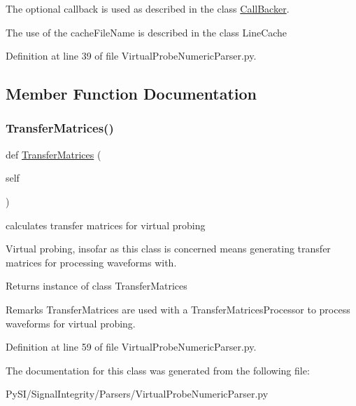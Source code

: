 The optional callback is used as described in the class \hyperlink{namespaceSignalIntegrity_1_1CallBacker}{Call\+Backer}.

The use of the cache\+File\+Name is described in the class Line\+Cache 

Definition at line 39 of file Virtual\+Probe\+Numeric\+Parser.\+py.



\subsection{Member Function Documentation}
\mbox{\label{classSignalIntegrity_1_1Parsers_1_1VirtualProbeNumericParser_1_1VirtualProbeNumericParser_a836e87421e9e21a6676da06625b644b1}} 
\subsubsection{\texorpdfstring{Transfer\+Matrices()}{TransferMatrices()}}
{\footnotesize\ttfamily def \hyperlink{classSignalIntegrity_1_1FrequencyDomain_1_1TransferMatrices_1_1TransferMatrices}{Transfer\+Matrices} (\begin{DoxyParamCaption}\item[{}]{self }\end{DoxyParamCaption})}



calculates transfer matrices for virtual probing 

Virtual probing, insofar as this class is concerned means generating transfer matrices for processing waveforms with.

\begin{DoxyReturn}{Returns}
instance of class Transfer\+Matrices
\end{DoxyReturn}
\begin{DoxyRemark}{Remarks}
Transfer\+Matrices are used with a Transfer\+Matrices\+Processor to process waveforms for virtual probing. 
\end{DoxyRemark}


Definition at line 59 of file Virtual\+Probe\+Numeric\+Parser.\+py.



The documentation for this class was generated from the following file\+:\begin{DoxyCompactItemize}
\item 
Py\+S\+I/\+Signal\+Integrity/\+Parsers/Virtual\+Probe\+Numeric\+Parser.\+py\end{DoxyCompactItemize}
